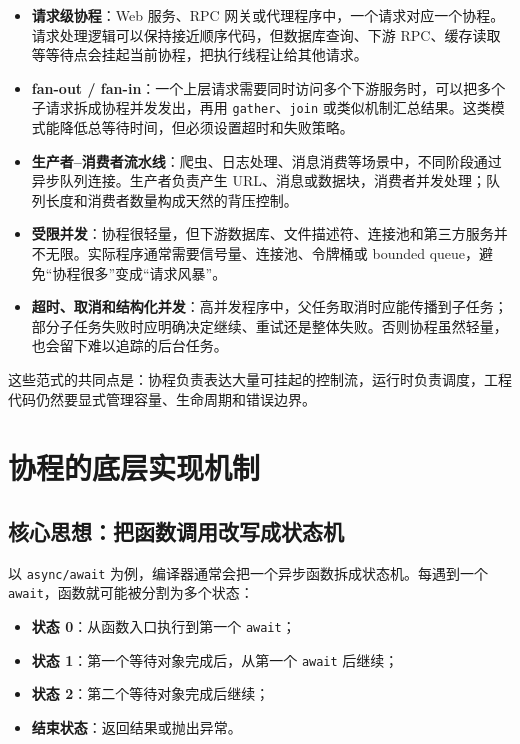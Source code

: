 \documentclass[UTF8,zihao=-4]{ctexart}
\begin{document}
\begin{itemize}
  \item \textbf{请求级协程}：Web 服务、RPC 网关或代理程序中，一个请求对应一个协程。请求处理逻辑可以保持接近顺序代码，但数据库查询、下游 RPC、缓存读取等等待点会挂起当前协程，把执行线程让给其他请求。
  \item \textbf{fan-out / fan-in}：一个上层请求需要同时访问多个下游服务时，可以把多个子请求拆成协程并发发出，再用 \texttt{gather}、\texttt{join} 或类似机制汇总结果。这类模式能降低总等待时间，但必须设置超时和失败策略。
  \item \textbf{生产者--消费者流水线}：爬虫、日志处理、消息消费等场景中，不同阶段通过异步队列连接。生产者负责产生 URL、消息或数据块，消费者并发处理；队列长度和消费者数量构成天然的背压控制。
  \item \textbf{受限并发}：协程很轻量，但下游数据库、文件描述符、连接池和第三方服务并不无限。实际程序通常需要信号量、连接池、令牌桶或 bounded queue，避免“协程很多”变成“请求风暴”。
  \item \textbf{超时、取消和结构化并发}：高并发程序中，父任务取消时应能传播到子任务；部分子任务失败时应明确决定继续、重试还是整体失败。否则协程虽然轻量，也会留下难以追踪的后台任务。
\end{itemize}

这些范式的共同点是：协程负责表达大量可挂起的控制流，运行时负责调度，工程代码仍然要显式管理容量、生命周期和错误边界。

\section{协程的底层实现机制}

\subsection{核心思想：把函数调用改写成状态机}

以 \texttt{async/await} 为例，编译器通常会把一个异步函数拆成状态机。每遇到一个 \texttt{await}，函数就可能被分割为多个状态：

\begin{itemize}
  \item \textbf{状态 0}：从函数入口执行到第一个 \texttt{await}；
  \item \textbf{状态 1}：第一个等待对象完成后，从第一个 \texttt{await} 后继续；
  \item \textbf{状态 2}：第二个等待对象完成后继续；
  \item \textbf{结束状态}：返回结果或抛出异常。
\end{itemize}
\end{document}
